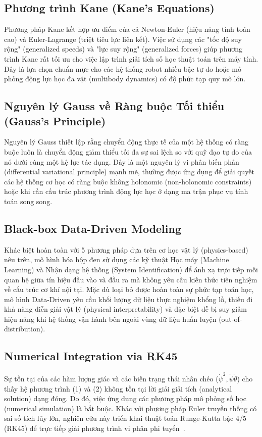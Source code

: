 \documentclass[conference, a4paper]{IEEEtran}
\begin{document}
\subsection{Phương trình Kane (Kane's Equations)}
Phương pháp Kane kết hợp ưu điểm của cả Newton-Euler (hiệu năng tính toán cao) và Euler-Lagrange (triệt tiêu lực liên kết). Việc sử dụng các "tốc độ suy rộng" (generalized speeds) và "lực suy rộng" (generalized forces) giúp phương trình Kane rất tối ưu cho việc lập trình giải tích số học thuật toán trên máy tính. Đây là lựa chọn chuẩn mực cho các hệ thống robot nhiều bậc tự do hoặc mô phỏng động lực học đa vật (multibody dynamics) có độ phức tạp quy mô lớn.

\subsection{Nguyên lý Gauss về Ràng buộc Tối thiểu (Gauss's Principle)}
Nguyên lý Gauss thiết lập rằng chuyển động thực tế của một hệ thống có ràng buộc luôn là chuyển động giảm thiểu tối đa sự sai lệch so với quỹ đạo tự do của nó dưới cùng một hệ lực tác dụng. Đây là một nguyên lý vi phân biến phân (differential variational principle) mạnh mẽ, thường được ứng dụng để giải quyết các hệ thống cơ học có ràng buộc không holonomic (non-holonomic constraints) hoặc khi cần cấu trúc phương trình động lực học ở dạng ma trận phục vụ tính toán song song.

\subsection{Black-box Data-Driven Modeling}
Khác biệt hoàn toàn với 5 phương pháp dựa trên cơ học vật lý (physics-based) nêu trên, mô hình hóa hộp đen sử dụng các kỹ thuật Học máy (Machine Learning) và Nhận dạng hệ thống (System Identification) để ánh xạ trực tiếp mối quan hệ giữa tín hiệu đầu vào và đầu ra mà không yêu cầu kiến thức tiên nghiệm về cấu trúc cơ khí nội tại. Mặc dù loại bỏ được hoàn toàn sự phức tạp toán học, mô hình Data-Driven yêu cầu khối lượng dữ liệu thực nghiệm khổng lồ, thiếu đi khả năng diễn giải vật lý (physical interpretability) và đặc biệt dễ bị suy giảm hiệu năng khi hệ thống vận hành bên ngoài vùng dữ liệu huấn luyện (out-of-distribution).

\subsection{Numerical Integration via RK45}
Sự tồn tại của các hàm lượng giác và các biến trạng thái nhân chéo ($\dot{\psi}^2, \dot{\psi}\dot{\theta}$) cho thấy hệ phương trình (1) và (2) không tồn tại lời giải giải tích (analytical solution) dạng đóng. Do đó, việc ứng dụng các phương pháp mô phỏng số học (numerical simulation) là bắt buộc. Khác với phương pháp Euler truyền thống có sai số tích lũy lớn, nghiên cứu này triển khai thuật toán Runge-Kutta bậc 4/5 (RK45) để trực tiếp giải phương trình vi phân phi tuyến~\cite{fehlberg1969low,dormand1980family}. 
\end{document}
